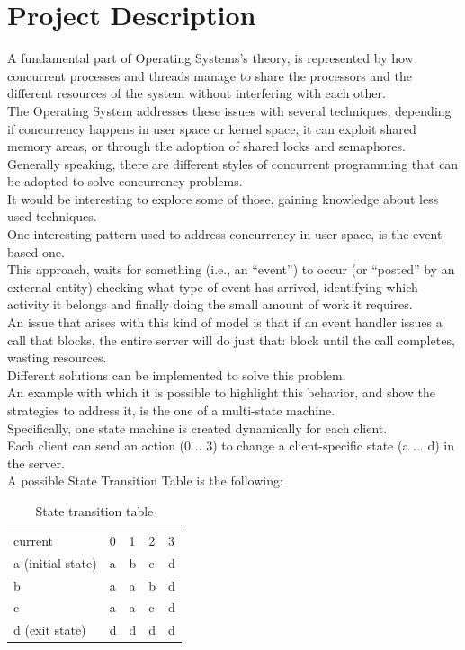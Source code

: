 \section{Project Description}

A fundamental part of Operating Systems's theory, is represented by how concurrent processes and threads manage to share the processors and the different resources of the system without interfering with each other. \\
The Operating System addresses these issues with several techniques, depending if concurrency happens in user space or kernel space, it can exploit shared memory areas, or through the adoption of shared locks and semaphores.\\
Generally speaking, there are different styles of concurrent programming that can be adopted to solve concurrency problems.\\
It would be interesting to explore some of those, gaining knowledge about less used techniques.\\
One interesting pattern used to address concurrency in user space, is the event-based one.\\
This approach, waits for something (i.e., an “event”) to occur (or “posted” by an external entity) checking what type of event has arrived, identifying which activity it belongs and finally doing the small amount of work it requires.\\
An issue that arises with this kind of model is that if an event handler issues a call that blocks, the entire server will do just that: block until the call completes, wasting resources.\\
Different solutions can be implemented to solve this problem. \\
An example with which it is possible to highlight this behavior, and show the strategies to address it, is the one of a multi-state machine. \\
Specifically, one state machine is created dynamically for each client.\\
Each client can send an action (0 .. 3) to change a client-specific state (a ... d) in the server.\\
A possible State Transition Table is the following:

\begin{table}[H]
\centering
\begin{tabular}{lllll}
current           & 0 & 1 & 2 & 3 \\
a (initial state) & a & b & c & d \\
b                 & a & a & b & d \\
c                 & a & a & c & d \\
d (exit state)    & d & d & d & d
\end{tabular}
\caption{State transition table}
\label{State transition table}
\end{table}

